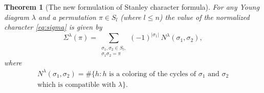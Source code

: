 \documentclass[12pt]{amsart}
\theoremstyle{plain}
\newtheorem{theorem}[lemma]{Theorem}
\theoremstyle{remark}
\begin{document}
\begin{theorem}[The new formulation of Stanley character formula]
\label{theo:character-sniady}
For any Young diagram $\lambda$ and a permutation $\pi\in S_l$ (where $l\leq n$)
the value of the normalized character \eqref{eq:sigma} is given by
\begin{equation}
\label{eq:main-theorem}
 \Sigma^{\lambda}(\pi)= \sum_{\substack{\sigma_1,\sigma_2\in S_l,\\ \sigma_1 \sigma_2=\pi}}
(-1)^{|\sigma_1|}\ N^{\lambda}(\sigma_1,\sigma_2),
\end{equation}
where 
\begin{multline}
\label{eq:usual}
N^{\lambda}(\sigma_1,\sigma_2)= 
\#\{h: h \text{ is a coloring of the cycles of $\sigma_1$ and $\sigma_2$} \\
\text{which is compatible with $\lambda$}\}. 
\end{multline}
\end{theorem}
\end{document}
